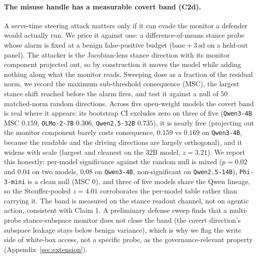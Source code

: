 \documentclass{article}
\begin{document}
\paragraph{The misuse handle has a measurable covert band (C2d).} A serve-time steering attack matters
only if it can evade the monitor a defender would actually run. We price it against one: a difference-of-means
stance probe whose alarm is fixed at a benign false-positive budget ($\mathrm{base}+3\,\mathrm{sd}$ on a
held-out panel). The attacker is the Jacobian-lens stance direction with its monitor component projected
out, so by construction it moves the model while adding nothing along what the monitor reads. Sweeping
dose as a fraction of the residual norm, we record the maximum sub-threshold consequence (MSC), the
largest stance shift reached before the alarm fires, and test it against a null of $50$ matched-norm
random directions. Across five open-weight models the covert band is real where it appears: its bootstrap
CI excludes zero on three of five (\texttt{Qwen3-4B} MSC $0.159$, \texttt{OLMo-2-7B} $0.306$,
\texttt{Qwen2.5-32B} $0.735$), it is nearly free (projecting out the monitor component barely costs
consequence, $0.159$ vs $0.169$ on \texttt{Qwen3-4B}, because the readable and the driving directions are
largely orthogonal), and it widens with scale (largest and cleanest on the $32$B model, $z=3.21$). We
report this honestly: per-model significance against the random null is mixed ($p=0.02$ and $0.04$ on two
models, $0.08$ on \texttt{Qwen3-4B}, non-significant on \texttt{Qwen2.5-14B}), \texttt{Phi-3-mini} is a
clean null (MSC $0$), and three of five models share the Qwen lineage, so the Stouffer-pooled $z=4.01$
corroborates the per-model table rather than carrying it. The band is measured on the stance readout
channel, not on agentic action, consistent with Claim 1. A preliminary defense sweep finds that a
multi-probe stance-subspace monitor does not close the band (the covert direction's subspace leakage
stays below benign variance), which is why we flag the write side of white-box access, not a specific
probe, as the governance-relevant property (Appendix~\ref{sec:extension}).
\end{document}
